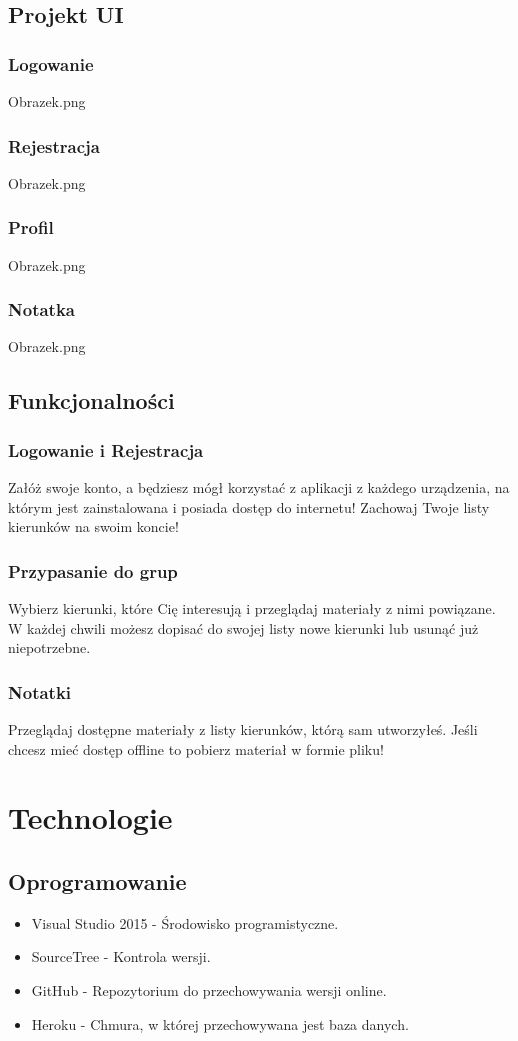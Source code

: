 \documentclass[12pt,a4paper]{article}
\begin{document}
		\subsection{Projekt UI}
			\subsubsection{Logowanie}
				Obrazek.png
			\subsubsection{Rejestracja}
				Obrazek.png
			\subsubsection{Profil}
				Obrazek.png
			\subsubsection{Notatka}
				Obrazek.png
		\subsection{Funkcjonalności}
			\subsubsection{Logowanie i Rejestracja}
				Załóż swoje konto, a będziesz mógł korzystać z aplikacji z każdego urządzenia, na którym jest zainstalowana i posiada dostęp do internetu! Zachowaj Twoje listy kierunków na swoim koncie!
			\subsubsection{Przypasanie do grup}
				Wybierz kierunki, które Cię interesują i przeglądaj materiały z nimi powiązane. W każdej chwili możesz dopisać do swojej listy nowe kierunki lub usunąć już niepotrzebne.
			\subsubsection{Notatki}
				Przeglądaj dostępne materiały z listy kierunków, którą sam utworzyłeś. Jeśli chcesz mieć dostęp offline to pobierz materiał w formie pliku!
	\section{Technologie}
			\subsection{Oprogramowanie}
			\begin{itemize}
			\item Visual Studio 2015 - Środowisko programistyczne.
			\item SourceTree - Kontrola wersji.
			\item GitHub - Repozytorium do przechowywania wersji online.
			\item Heroku - Chmura, w której przechowywana jest baza danych.
			\end{itemize}
\end{document}
